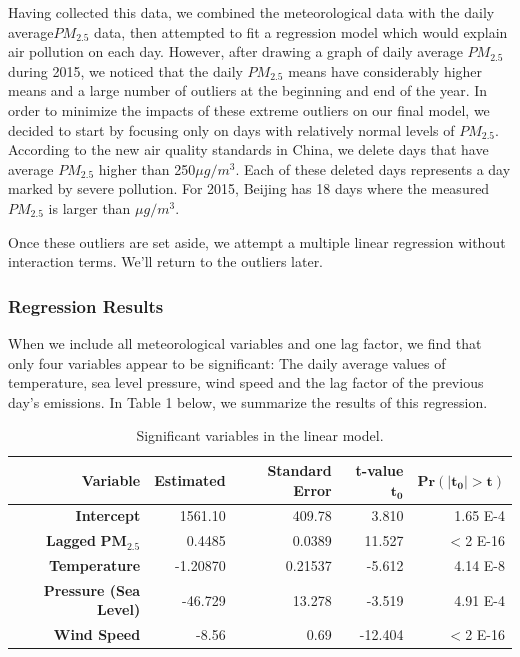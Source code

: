 \documentclass[11pt]{article} %
\begin{document}
Having collected this data, we combined the meteorological data with the daily average\(PM_{2.5}\) data, then attempted to fit a regression model which would explain air pollution on each day. However, after drawing a graph of daily average \(PM_{2.5}\) during 2015, we noticed that the daily \(PM_{2.5}\) means have considerably higher means and a large number of outliers at the beginning and end of the year. In order to minimize the impacts of these extreme outliers on our final model, we decided to start by focusing only on days with relatively normal levels of \(PM_{2.5}\). According to the new air quality standards in China, we delete days that have average \(PM_{2.5}\) higher than 250\(\mu g/m^3\). Each of these deleted days represents a day marked by severe pollution. For 2015, Beijing has 18 days where the measured \(PM_{2.5}\) is larger than \(\mu g/m^3\).


 
 
Once these outliers are set aside, we attempt a multiple linear regression without interaction terms. We'll return to the outliers later. 

\subsubsection{Regression Results} 
When we include all meteorological variables and one lag factor, we find that only four variables appear to be significant: The daily average values of temperature, sea level pressure, wind speed and the lag factor of the previous day's emissions. In Table 1 below, we summarize the results of this regression.
 
 \begin{table}
 \begin{tabular} {| r | r | r | r | r |}
 \hline
 \textbf{Variable} & 
\textbf{Estimated} & 
\textbf{Standard Error} & 
\textbf{t-value} \(\mathbf{t_0}\) & 
\(\mathbf{Pr(\vert t_0 \vert >t)}\) \\ \hline
\textbf{Intercept} & 1561.10 & 409.78 & 3.810 & 1.65 E-4 \\ \hline
\textbf{Lagged }\(\mathbf{PM_{2.5}}\) & 0.4485 & 0.0389 & 11.527 & \(<\)2 E-16 \\ \hline
\textbf{Temperature} & -1.20870 & 0.21537 & -5.612 & 4.14 E-8 \\ \hline
\textbf{Pressure (Sea Level)} & -46.729 & 13.278 & -3.519 & 4.91 E-4 \\ \hline
\textbf{Wind Speed} & -8.56 & 0.69 & -12.404 & \(<\)2 E-16 \\ \hline
 \end{tabular}
 \caption{Significant variables in the linear model.}
 \end{table}
 
\end{document}
